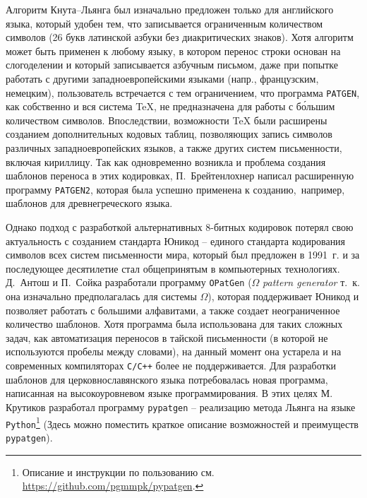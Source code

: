\documentclass[12pt,a4paper,oneside]{extarticle}
\begin{document}
Алгоритм Кнута--Льянга был изначально предложен только для английского языка, который удобен тем, что записывается ограниченным количеством символов (26 букв латинской азбуки без диакритических знаков). Хотя алгоритм может быть применен к любому языку, в котором перенос строки основан на слогоделении и который записывается азбучным письмом, даже при попытке работать с другими западноевропейскими языками (напр., французским, немецким), пользователь встречается с тем ограничением, что программа \verb+PATGEN+, как собственно и вся система \TeX{}, не предназначена для работы с бо́льшим количеством символов. Впоследствии, возможности \TeX{} были расширены созданием дополнительных кодовых таблиц, позволяющих запись символов различных западноевропейских языков\autocite[Кодировка \textenglish{Extended \TeX{} Font Encoding Scheme} (ET). См. ][]{ferguson1990}, а также других систем письменности, включая кириллицу\autocite[Описание существующих кодировок см. ][]{mittelbach2016}. Так как одновременно возникла и проблема создания шаблонов переноса в этих кодировках, П.~Брейтенлохнер написал расширенную программу \verb+PATGEN2+\autocite[См. описание в пособии ][]{patgen2}, которая была успешно применена к созданию, например, шаблонов для древнегреческого языка\autocite[][]{haralambous1992}.

Однако подход с разработкой альтернативных 8-битных кодировок потерял свою актуальность с созданием стандарта Юникод -- единого стандарта кодирования символов всех систем письменности мира, который был предложен в 1991~г. и за последующее десятилетие стал общепринятым в компьютерных технологиях. Д.~Антош и  П.~Сойка разработали программу \verb+OPatGen+ ($\Omega$ \emph{pattern generator} т.~к. она изначально предполагалась для системы $\Omega$), которая поддерживает Юникод и позволяет работать с большими алфавитами, а также создает неограниченное количество шаблонов\autocite[][]{opatgen}. Хотя программа была использована для таких сложных задач, как автоматизация переносов в тайской письменности (в которой не используются пробелы между словами)\autocite[][]{sojka2003}, на данный момент она устарела и на современных компиляторах \verb!C/C++! более не поддерживается. Для разработки шаблонов для церковнославянского языка потребовалась новая программа, написанная на  высокоуровневом языке программирования. В этих целях М. Крутиков разработал программу \verb+pypatgen+ -- реализацию метода Льянга на языке \verb+Python+\footnote{Описание и инструкции по пользованию см. \url{https://github.com/pgmmpk/pypatgen}.} (Здесь можно поместить краткое описание возможностей и преимуществ \verb+pypatgen+).
\end{document}
